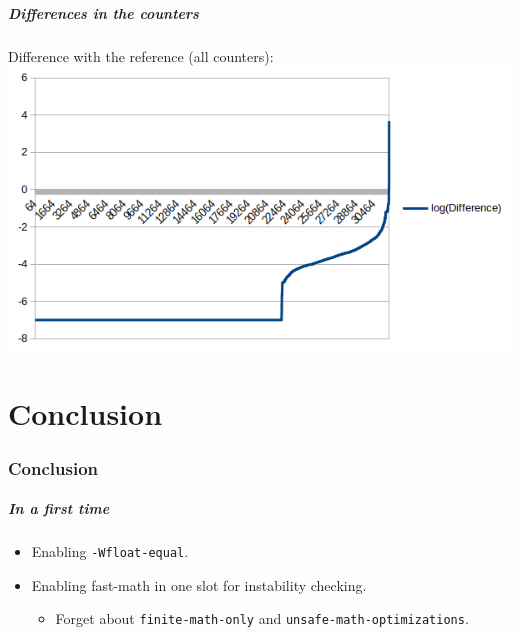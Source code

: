 \documentclass{beamer}
\begin{document}
\begin{frame}[fragile]
    \frametitle{Differences in the counters}

    Difference with the reference (all counters):
    \includegraphics[width=\textwidth]{fast-math_difference.png}
\end{frame}

\part{Conclusion}

\section{Conclusion}

\begin{frame}[fragile]
    \frametitle{In a first time}

    \begin{itemize}
        \item Enabling \verb'-Wfloat-equal'.
        \item Enabling fast-math in one slot for instability checking.
              \begin{itemize}
                  \item Forget about \verb'finite-math-only' and \verb'unsafe-math-optimizations'.
              \end{itemize}
    \end{itemize}
\end{frame}
\end{document}
